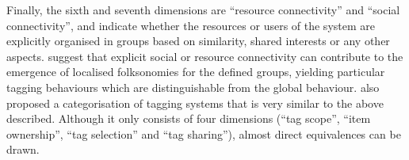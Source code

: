 Finally, the sixth and seventh dimensions are ``resource connectivity'' and ``social connectivity'', and indicate whether the resources or users of the system are explicitly organised in groups based on similarity, shared interests or any other aspects. \cite{marlow2006} suggest that explicit social or resource connectivity can contribute to the emergence of localised folksonomies for the defined groups, yielding particular tagging behaviours which are distinguishable from the global behaviour.
\cite{Sen} also proposed a categorisation of tagging systems that is very similar to the above described.
Although it only consists of four dimensions (``tag scope'', ``item ownership'', ``tag selection'' and ``tag sharing''), almost direct equivalences can be drawn.


